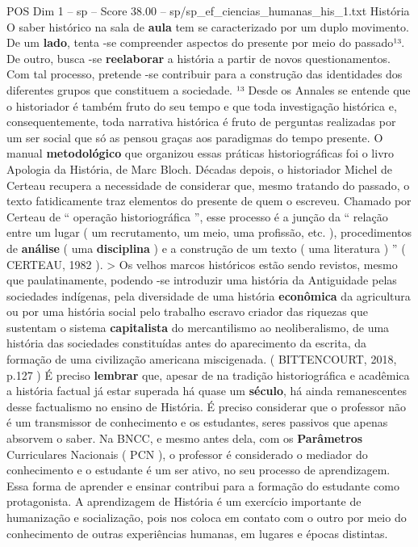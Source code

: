 \begin{textsample}{POS Dim 1 – sp – Score 38.00 – sp/sp\_ef\_ciencias\_humanas\_his\_1.txt}  \label{ex:f1_pos_120}
História O saber histórico na sala de \textbf{aula} tem se caracterizado por um duplo movimento.
De um \textbf{lado}, tenta -se compreender aspectos do presente por meio do passado¹³.
De outro, busca -se \textbf{reelaborar} a história a partir de novos questionamentos.
Com tal processo, pretende -se contribuir para a construção das identidades dos diferentes grupos que constituem a sociedade. ¹³ Desde os Annales se entende que o historiador é também fruto do seu tempo e que toda investigação histórica e, consequentemente, toda narrativa histórica é fruto de perguntas realizadas por um ser social que só as pensou graças aos paradigmas do tempo presente.
O manual \textbf{metodológico} que organizou essas práticas historiográficas foi o livro Apologia da História, de Marc Bloch.
Décadas depois, o historiador Michel de Certeau recupera a necessidade de considerar que, mesmo tratando do passado, o texto fatidicamente traz elementos do presente de quem o escreveu.
Chamado por Certeau de “ operação historiográfica ”, esse processo é a junção da “ relação entre um lugar ( um recrutamento, um meio, uma profissão, etc. ), procedimentos de \textbf{análise} ( uma \textbf{disciplina} ) e a construção de um texto ( uma literatura ) ” ( CERTEAU, 1982 ). > Os velhos marcos históricos estão sendo revistos, mesmo que paulatinamente, podendo -se introduzir uma história da Antiguidade pelas sociedades indígenas, pela diversidade de uma história \textbf{econômica} da agricultura ou por uma história social pelo trabalho escravo criador das riquezas que sustentam o sistema \textbf{capitalista} do mercantilismo ao neoliberalismo, de uma história das sociedades constituídas antes do aparecimento da escrita, da formação de uma civilização americana miscigenada. ( BITTENCOURT, 2018, p.127 ) É preciso \textbf{lembrar} que, apesar de na tradição historiográfica e acadêmica a história factual já estar superada há quase um \textbf{século}, há ainda remanescentes desse factualismo no ensino de História.
É preciso considerar que o professor não é um transmissor de conhecimento e os estudantes, seres passivos que apenas absorvem o saber.
Na BNCC, e mesmo antes dela, com os \textbf{Parâmetros} Curriculares Nacionais ( PCN ), o professor é considerado o mediador do conhecimento e o estudante é um ser ativo, no seu processo de aprendizagem.
Essa forma de aprender e ensinar contribui para a formação do estudante como protagonista.
A aprendizagem de História é um exercício importante de humanização e socialização, pois nos coloca em contato com o outro por meio do conhecimento de outras experiências humanas, em lugares e épocas distintas.

\end{textsample}
